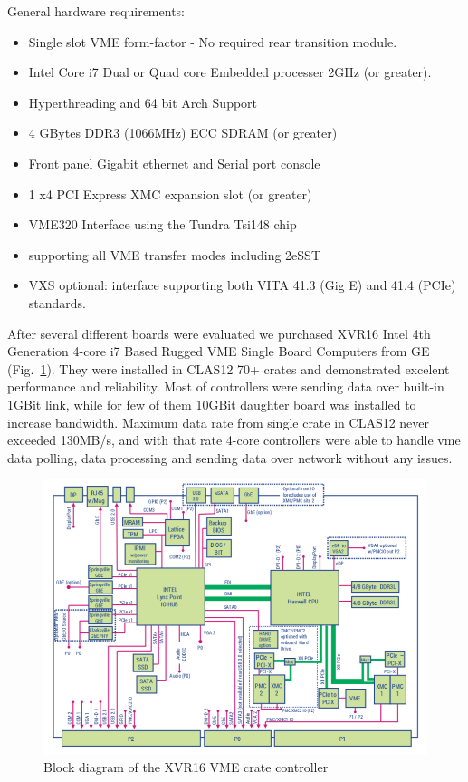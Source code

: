 General hardware requirements:

\begin{itemize}
	\item Single slot VME form-factor - No required rear transition module.
	\item Intel Core i7 Dual or Quad core Embedded processer 2GHz (or greater).
	\item Hyperthreading and 64 bit Arch Support
	\item 4 GBytes DDR3 (1066MHz) ECC SDRAM (or greater)
	\item Front panel Gigabit ethernet and Serial port console
	\item 1 x4 PCI Express XMC expansion slot (or greater)
	\item VME320 Interface using the Tundra Tsi148 chip
	\item supporting all VME transfer modes including 2eSST
	\item VXS optional: interface supporting both VITA 41.3 (Gig E) and 41.4 (PCIe) standards.
\end{itemize}

After several different boards were evaluated we purchased XVR16 Intel 4th Generation 4-core i7 Based Rugged VME Single Board Computers from GE (Fig.~\ref{fig:XVR16diagram}). They were installed in CLAS12 70+ crates and demonstrated excelent performance and reliability. Most of controllers were sending data over built-in 1GBit link, while for few of them 10GBit daughter board was installed to increase bandwidth. Maximum data rate from single crate in CLAS12 never exceeded 130MB/s, and with that rate 4-core controllers were able to handle vme data polling, data processing and sending data over network without any issues. 

\begin{figure}[hbt]
	\centering
	\includegraphics[width=1.0\columnwidth,keepaspectratio]{img/XVR16_diagram.png}
	\caption{Block diagram of the XVR16 VME crate controller}
	\label{fig:XVR16diagram}
\end{figure}



